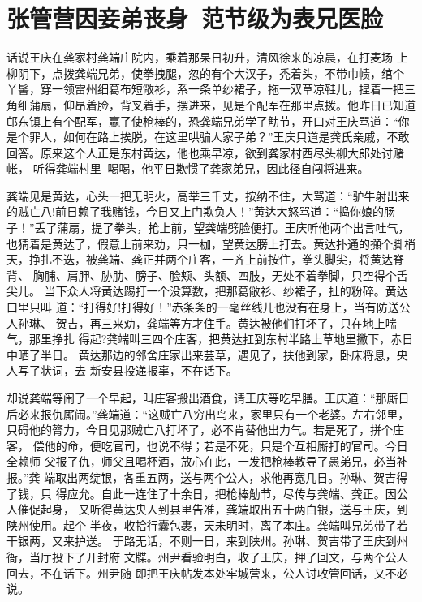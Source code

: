 \chapter{张管营因妾弟丧身~范节级为表兄医脸}

话说王庆在龚家村龚端庄院内，乘着那杲日初升，清风徐来的凉晨，在打麦场
上柳阴下，点拨龚端兄弟，使拳拽腿，忽的有个大汉子，秃着头，不带巾帻，绾个
丫髻，穿一领雷州细葛布短敞衫，系一条单纱裙子，拖一双草凉鞋儿，捏着一把三
角细蒲扇，仰昂着脸，背叉着手，摆进来，见是个配军在那里点拨。他昨日已知道
邙东镇上有个配军，赢了使枪棒的，恐龚端兄弟学了觔节，开口对王庆骂道：“你
是个罪人，如何在路上挨脱，在这里哄骗人家子弟？”王庆只道是龚氏亲戚，不敢
回答。原来这个人正是东村黄达，他也乘早凉，欲到龚家村西尽头柳大郎处讨赌帐，
听得龚端村里喝喝，他平日欺惯了龚家弟兄，因此径自闯将进来。

龚端见是黄达，心头一把无明火，高举三千丈，按纳不住，大骂道：“驴牛射出来
的贼亡八!前日赖了我赌钱，今日又上门欺负人！”黄达大怒骂道：“捣你娘的肠
子！”丢了蒲扇，提了拳头，抢上前，望龚端劈脸便打。王庆听他两个出言吐气，
也猜着是黄达了，假意上前来劝，只一枷，望黄达膀上打去。黄达扑通的攧个脚梢
天，挣扎不迭，被龚端、龚正并两个庄客，一齐上前按住，拳头脚尖，将黄达脊背、
胸脯、肩胛、胁肋、膀子、脸颊、头额、四肢，无处不着拳脚，只空得个舌尖儿。
当下众人将黄达踢打一个没算数，把那葛敞衫、纱裙子，扯的粉碎。黄达口里只叫
道：“打得好!打得好！”赤条条的一毫丝线儿也没有在身上，当有防送公人孙琳、
贺吉，再三来劝，龚端等方才住手。黄达被他们打坏了，只在地上喘气，那里挣扎
得起?龚端叫三四个庄客，把黄达扛到东村半路上草地里撇下，赤日中晒了半日。
黄达那边的邻舍庄家出来芸草，遇见了，扶他到家，卧床将息，央人写了状词，去
新安县投递报辜，不在话下。

却说龚端等闹了一个早起，叫庄客搬出酒食，请王庆等吃早膳。王庆道：“那厮日
后必来报仇厮闹。”龚端道：“这贼亡八穷出鸟来，家里只有一个老婆。左右邻里，
只碍他的膂力，今日见那贼亡八打坏了，必不肯替他出力气。若是死了，拼个庄客，
偿他的命，便吃官司，也说不得；若是不死，只是个互相厮打的官司。今日全赖师
父报了仇，师父且喝杯酒，放心在此，一发把枪棒教导了愚弟兄，必当补报。”龚
端取出两绽银，各重五两，送与两个公人，求他再宽几日。孙琳、贺吉得了钱，只
得应允。自此一连住了十余日，把枪棒觔节，尽传与龚端、龚正。因公人催促起身，
又听得黄达央人到县里告准，龚端取出五十两白银，送与王庆，到陕州使用。起个
半夜，收拾行囊包裹，天未明时，离了本庄。龚端叫兄弟带了若干银两，又来护送。
于路无话，不则一日，来到陕州。孙琳、贺吉带了王庆到州衙，当厅投下了开封府
文牒。州尹看验明白，收了王庆，押了回文，与两个公人回去，不在话下。州尹随
即把王庆帖发本处牢城营来，公人讨收管回话，又不必说。

